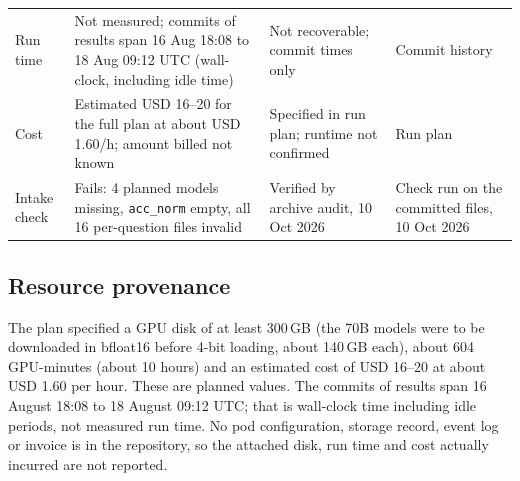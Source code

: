 \documentclass[10pt]{article}
\begin{document}
\begin{table}[H]
\begin{tabular}{p{}p{}p{}p{}}
Run time & Not measured; commits of results span 16 Aug 18:08 to 18 Aug 09:12 UTC (wall-clock, including idle time) & Not recoverable; commit times only & Commit history \\
Cost & Estimated USD 16--20 for the full plan at about USD 1.60/h; amount billed not known & Specified in run plan; runtime not confirmed & Run plan \\
Intake check & Fails: 4 planned models missing, \texttt{acc\_norm} empty, all 16 per-question files invalid & Verified by archive audit, 10 Oct 2026 & Check run on the committed files, 10 Oct 2026 \\
\bottomrule
\end{tabular}
\end{table}

\subsection*{Resource provenance}
The plan specified a GPU disk of at least 300\,GB (the 70B models were to be downloaded in bfloat16 before 4-bit loading, about 140\,GB each), about 604 GPU-minutes (about 10 hours) and an estimated cost of USD 16--20 at about USD 1.60 per hour. These are planned values. The commits of results span 16 August 18:08 to 18 August 09:12 UTC; that is wall-clock time including idle periods, not measured run time. No pod configuration, storage record, event log or invoice is in the repository, so the attached disk, run time and cost actually incurred are not reported.
\end{document}
